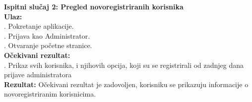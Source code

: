 \documentclass[times, utf8, zavrsni]{fer}
\begin{document}
	    \noindent \textbf{Ispitni slučaj 2: Pregled novoregistriranih korisnika}\\
			\textbf{Ulaz:}\\
			    . Pokretanje aplikacije.\\
			    . Prijava kao Administrator.\\
			    . Otvaranje početne stranice.\\
			   
			\noindent\textbf{Očekivani rezultat:}\\
			    . Prikaz svih korisnika, i njihovih opcija, koji su se registrirali od zadnjeg dana prijave administratora\\
			    
			\noindent\textbf{Rezultat:}
			    \noindent Očekivani rezultat je zadovoljen, korisniku se prikazuju informacije o novoregistriranim korisnicima.
			    
\end{document}
